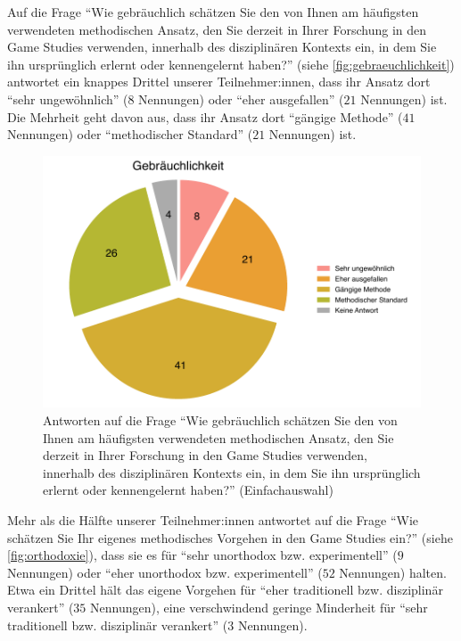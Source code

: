 \documentclass{scrartcl}
\begin{document}
Auf die Frage \enquote{Wie gebräuchlich schätzen Sie den von Ihnen am häufigsten verwendeten methodischen Ansatz, den Sie derzeit in Ihrer Forschung in den Game Studies verwenden, innerhalb des disziplinären Kontexts ein, in dem Sie ihn ursprünglich erlernt oder kennengelernt haben?} (siehe \autoref{fig:gebraeuchlichkeit}) antwortet ein knappes Drittel unserer Teilnehmer:innen, dass ihr Ansatz dort \enquote{sehr ungewöhnlich} ($8$ Nennungen) oder \enquote{eher ausgefallen} ($21$ Nennungen) ist.
Die Mehrheit geht davon aus, dass ihr Ansatz dort \enquote{gängige Methode} ($41$ Nennungen) oder \enquote{methodischer Standard} ($21$ Nennungen) ist.

\begin{figure}[ht]
   \includegraphics[width=1\textwidth]{gebraeuchlichkeit.pdf}
   \caption{Antworten auf die Frage \enquote{Wie gebräuchlich schätzen Sie den von Ihnen am häufigsten verwendeten methodischen Ansatz, den Sie derzeit in Ihrer Forschung in den Game Studies verwenden, innerhalb des disziplinären Kontexts ein, in dem Sie ihn ursprünglich erlernt oder kennengelernt haben?} (Einfachauswahl)}
   \label{fig:gebraeuchlichkeit}
\end{figure}

Mehr als die Hälfte unserer Teilnehmer:innen antwortet auf die Frage \enquote{Wie schätzen Sie Ihr eigenes methodisches Vorgehen in den Game Studies ein?} (siehe \autoref{fig:orthodoxie}), dass sie es für \enquote{sehr unorthodox bzw. experimentell} ($9$ Nennungen) oder \enquote{eher unorthodox bzw. experimentell} ($52$ Nennungen) halten.
Etwa ein Drittel hält das eigene Vorgehen für \enquote{eher traditionell bzw. disziplinär verankert} ($35$ Nennungen), eine verschwindend geringe Minderheit für \enquote{sehr traditionell bzw. disziplinär verankert} ($3$ Nennungen).
\end{document}
